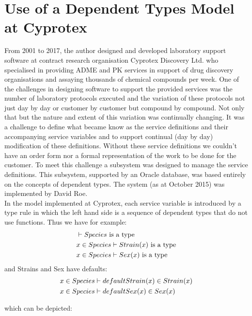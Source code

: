 \documentclass[10pt,a4paper]{article}
\begin{document}
\section{Use of a Dependent Types Model at Cyprotex}
\noindent
From 2001 to 2017, the author designed and developed laboratory support software at contract research organisation Cyprotex Discovery Ltd. who specialised in providing ADME and PK 
services in support of drug discovery organisations and assaying thousands of chemical compounds per week.
One of the challenges in designing software to support the provided services was the number of 
laboratory protocols executed and the variation of these protocols not just day by day or customer by customer but compound by compound. Not only that but the nature and extent of this variation was continually changing. It was a challenge to define what became know as the service definitions and their accompanying service variables and to support continual (day by day) modification of these definitions. Without these service definitions we couldn't have an order form nor a formal representation of the work to be done for the customer.  
\noindent To meet this challenge a subsystem was designed to manage the service definitions.
This subsystem, supported by an Oracle database,  was based entirely on the concepts of dependent types. The system (as at October 2015) was implemented by David Roe. \\

\noindent In the model implemented at Cyprotex, each service variable is introduced by a type rule in which the left hand side is a sequence of dependent types that do not use functions. Thus we have for example:
\begin{align*}
& \vdash Species\mbox{ is a type} \\
& x \in Species\vdash Strain(x)\mbox{ is a type} \\
& x \in Species\vdash Sex(x)\mbox{ is a type} \\
\end{align*}
\noindent and Strains and Sex have defaults:
\begin{align*}
& x \in Species\vdash defaultStrain(x) \in Strain(x) \\
& x \in Species\vdash defaultSex(x) \in Sex(x) \\
\end{align*}

\noindent which can be depicted:
\end{document}

